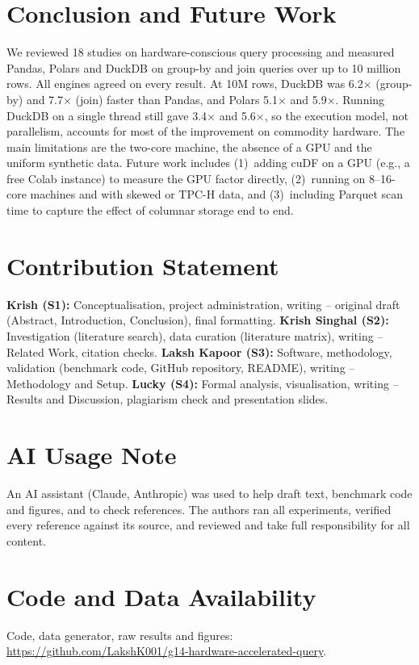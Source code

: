 \documentclass[conference,a4paper]{IEEEtran}
\begin{document}
\section{Conclusion and Future Work}\label{sec:conclusion}
We reviewed 18 studies on hardware-conscious query processing and measured Pandas, Polars and DuckDB on group-by and join queries over up to 10 million rows. All engines agreed on every result. At 10M rows, DuckDB was 6.2$\times$ (group-by) and 7.7$\times$ (join) faster than Pandas, and Polars 5.1$\times$ and 5.9$\times$. Running DuckDB on a single thread still gave 3.4$\times$ and 5.6$\times$, so the execution model, not parallelism, accounts for most of the improvement on commodity hardware. The main limitations are the two-core machine, the absence of a GPU and the uniform synthetic data. Future work includes (1)~adding cuDF on a GPU (e.g., a free Colab instance) to measure the GPU factor directly, (2)~running on 8--16-core machines and with skewed or TPC-H data, and (3)~including Parquet scan time to capture the effect of columnar storage end to end.

\section*{Contribution Statement}
\textbf{Krish (S1):} Conceptualisation, project administration, writing -- original draft (Abstract, Introduction, Conclusion), final formatting. \textbf{Krish Singhal (S2):} Investigation (literature search), data curation (literature matrix), writing -- Related Work, citation checks. \textbf{Laksh Kapoor (S3):} Software, methodology, validation (benchmark code, GitHub repository, README), writing -- Methodology and Setup. \textbf{Lucky (S4):} Formal analysis, visualisation, writing -- Results and Discussion, plagiarism check and presentation slides.

\section*{AI Usage Note}
An AI assistant (Claude, Anthropic) was used to help draft text, benchmark code and figures, and to check references. The authors ran all experiments, verified every reference against its source, and reviewed and take full responsibility for all content.

\section*{Code and Data Availability}
Code, data generator, raw results and figures: \url{https://github.com/LakshK001/g14-hardware-accelerated-query}.
\end{document}
